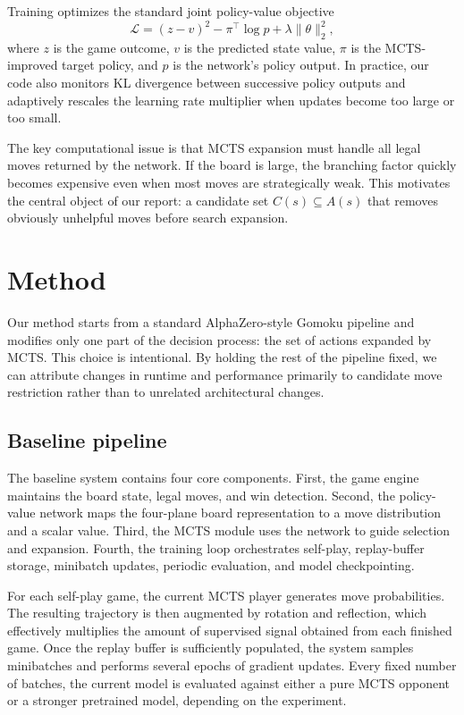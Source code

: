 \documentclass{article}
\begin{document}
Training optimizes the standard joint policy-value objective
\begin{equation}
  \mathcal{L} = (z - v)^2 - \pi^\top \log p + \lambda \lVert \theta \rVert_2^2,
\end{equation}
where \(z\) is the game outcome, \(v\) is the predicted state value, \(\pi\) is the MCTS-improved target policy, and \(p\) is the network's policy output. In practice, our code also monitors KL divergence between successive policy outputs and adaptively rescales the learning rate multiplier when updates become too large or too small.

The key computational issue is that MCTS expansion must handle all legal moves returned by the network. If the board is large, the branching factor quickly becomes expensive even when most moves are strategically weak. This motivates the central object of our report: a candidate set \(C(s) \subseteq A(s)\) that removes obviously unhelpful moves before search expansion.

\section{Method}

Our method starts from a standard AlphaZero-style Gomoku pipeline and modifies only one part of the decision process: the set of actions expanded by MCTS. This choice is intentional. By holding the rest of the pipeline fixed, we can attribute changes in runtime and performance primarily to candidate move restriction rather than to unrelated architectural changes.

\subsection{Baseline pipeline}

The baseline system contains four core components. First, the game engine maintains the board state, legal moves, and win detection. Second, the policy-value network maps the four-plane board representation to a move distribution and a scalar value. Third, the MCTS module uses the network to guide selection and expansion. Fourth, the training loop orchestrates self-play, replay-buffer storage, minibatch updates, periodic evaluation, and model checkpointing.

For each self-play game, the current MCTS player generates move probabilities. The resulting trajectory is then augmented by rotation and reflection, which effectively multiplies the amount of supervised signal obtained from each finished game. Once the replay buffer is sufficiently populated, the system samples minibatches and performs several epochs of gradient updates. Every fixed number of batches, the current model is evaluated against either a pure MCTS opponent or a stronger pretrained model, depending on the experiment.
\end{document}
